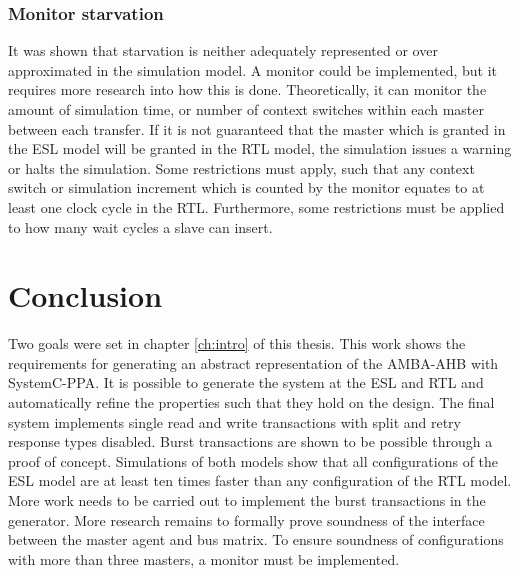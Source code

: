 \subsubsection{Monitor starvation}
It was shown that starvation is neither adequately represented or over approximated in the simulation model. A monitor could be implemented, but it requires more research into how this is done. Theoretically, it can monitor the amount of simulation time, or number of context switches within each master between each transfer. If it is not guaranteed that the master which is granted in the ESL model will be granted in the RTL model, the simulation issues a warning or halts the simulation. Some restrictions must apply, such that any context switch or simulation increment which is counted by the monitor equates to at least one clock cycle in the RTL. Furthermore, some restrictions must be applied to how many wait cycles a slave can insert.    


\section{Conclusion}
\label{sec:concl}
Two goals were set in chapter \ref{ch:intro} of this thesis. This work shows the requirements for generating an abstract representation of the AMBA-AHB with SystemC-PPA. It is possible to generate the system at the ESL and RTL and automatically refine the properties such that they hold on the design. The final system implements single read and write transactions with split and retry response types disabled. Burst transactions are shown to be possible through a proof of concept. Simulations of both models show that all configurations of the ESL model are at least ten times faster than any configuration of the RTL model. More work needs to be carried out to implement the burst transactions in the generator. More research remains to formally prove soundness of the interface between the master agent and bus matrix. To ensure soundness of configurations with more than three masters, a monitor must be implemented.  






     



